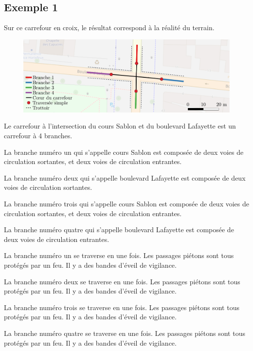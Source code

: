 \begin{appendix}
\newpage
\section*{Exemple 1}

Sur ce carrefour en croix, le résultat correspond à la réalité du terrain.

\begin{figure}[ht]
  \centering
  \includegraphics[width=\textwidth]{images/annexes/carrefour_simple.pdf}
  \label{fig:exemple1}
\end{figure}

Le carrefour à l'intersection du cours Sablon et du boulevard Lafayette est un carrefour à 4 branches.

\newpar{}

La branche numéro un qui s'appelle cours Sablon est composée de deux voies de circulation sortantes, et deux voies de circulation entrantes.

La branche numéro deux qui s'appelle boulevard Lafayette est composée de deux voies de circulation sortantes.

La branche numéro trois qui s'appelle cours Sablon est composée de deux voies de circulation sortantes, et deux voies de circulation entrantes.

La branche numéro quatre qui s'appelle boulevard Lafayette est composée de deux voies de circulation entrantes.

\newpar{}

La branche numéro un se traverse en une fois. Les passages piétons sont tous protégés par un feu. Il y a des bandes d'éveil de vigilance.

La branche numéro deux se traverse en une fois. Les passages piétons sont tous protégés par un feu. Il y a des bandes d'éveil de vigilance.

La branche numéro trois se traverse en une fois. Les passages piétons sont tous protégés par un feu. Il y a des bandes d'éveil de vigilance.

La branche numéro quatre se traverse en une fois. Les passages piétons sont tous protégés par un feu. Il y a des bandes d'éveil de vigilance.


\end{appendix}
